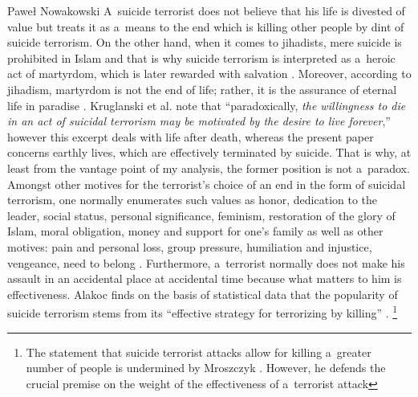 \begin{artengenv}{Paweł Nowakowski}
A~suicide terrorist does not believe that his life is divested of value but treats it as a~means to the end which is killing other people by dint of suicide terrorism. On the other hand, when it comes to jihadists, mere suicide is prohibited in Islam and that is why suicide terrorism is interpreted as a~heroic act of martyrdom, which is later rewarded with salvation 
\parencites[see][pp.27–33]{Bruce2013Intrinsic}[][pp.15–24]{Roy2016Can}. %
 Moreover, according to jihadism, martyrdom is not the end of life; rather, it is the assurance of eternal life in paradise 
\parencite[][p.336]{Kruglanski2009Fully}. %
 Kruglanski et al. 
\parencite*[][p.336]{Kruglanski2009Fully} %
 note that ``paradoxically, \textit{the willingness to die in an act of suicidal terrorism may be motivated by the desire to live forever},'' however this excerpt deals with life after death, whereas the present paper concerns earthly lives, which are effectively terminated by suicide. That is why, at least from the vantage point of my analysis, the former position is not a~paradox. Amongst other motives for the terrorist's choice of an end in the form of suicidal terrorism, one normally enumerates such values as honor, dedication to the leader, social status, personal significance, feminism, restoration of the glory of Islam, moral obligation, money and support for one's family as well as other motives: pain and personal loss, group pressure, humiliation and injustice, vengeance, need to belong 
\parencite[cited in][p.332]{Kruglanski2009Fully}. %
 Furthermore, a~terrorist normally does not make his assault in an accidental place at accidental time because what matters to him is effectiveness. Alakoc 
\parencite*[][p.1]{Alakoc2017When} %
 finds on the basis of statistical data that the popularity of suicide terrorism stems from its ``effective strategy for terrorizing by killing'' 
\parencites[see also][pp.7–11]{Hutchins2017Islam}[][pp.81–92]{Sheehan2014Are}.%
\footnote{The statement that suicide terrorist attacks allow for killing a~greater number of people is undermined by Mroszczyk 
\parencite*[][]{Mroszczyk2019To}. %
 However, he defends the crucial premise on the weight of the effectiveness of a~terrorist attack 
}
\end{artengenv}
